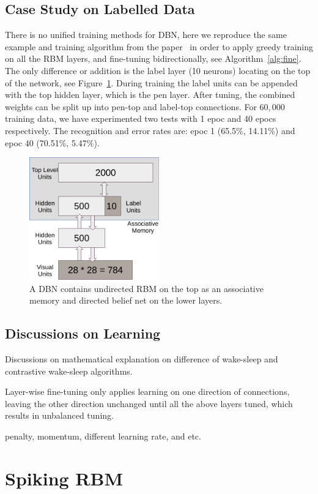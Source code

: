 \documentclass[11pt,twoside,a4paper]{article}
\begin{document}
	\subsection{Case Study on Labelled Data}
	There is no unified training methods for DBN, here we reproduce the same example and training algorithm from the paper~\cite{hinton2006fast} in order to apply greedy training on all the RBM layers, and fine-tuning bidirectionally, see Algorithm~\ref{alg:fine}.
	The only difference or addition is the label layer (10 neurons) locating on the top of the network, see Figure~\ref{Fig:case}.
	During training the label units can be appended with the top hidden layer, which is the pen layer.
	After tuning, the combined weights can be split up into pen-top and label-top connections.
	For $60,000$ training data, we have experimented two tests with 1 epoc and 40 epocs respectively.
	The recognition and error rates are: epoc 1 (65.5\%, 14.11\%) and epoc 40 (70.51\%, 5.47\%). 
	
	\begin{figure}[hbt]
			\centering
			\includegraphics[width=0.5\textwidth]{img/DBN.pdf}
			\caption{A DBN contains undirected RBM on the top as an associative memory and directed belief net on the lower layers.} 
			\label{Fig:case}
	\end{figure}
	\subsection{Discussions on Learning}
	Discussions on mathematical explanation on difference of wake-sleep and contrastive wake-sleep algorithms.
	
	Layer-wise fine-tuning only applies learning on one direction of connections, leaving the other direction unchanged until all the above layers tuned, which results in unbalanced tuning.
	
	penalty, momentum, different learning rate, and etc.
\section{Spiking RBM\cite{neftci2013event}}
\end{document}
